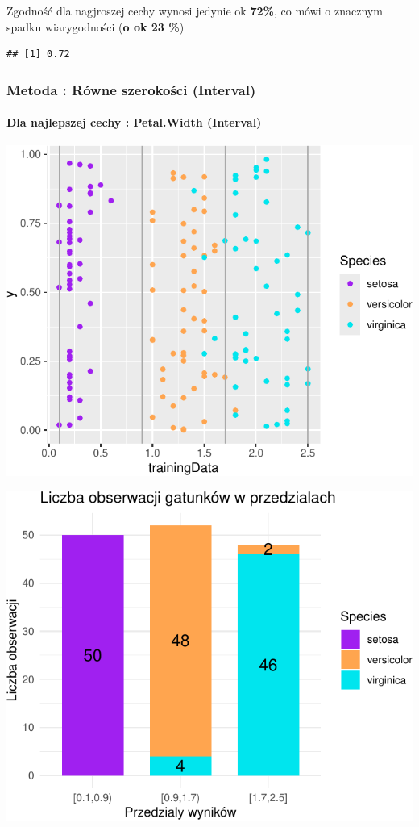 \documentclass[
  12pt,
]{article}
\begin{document}
Zgodność dla nagjroszej cechy wynosi jedynie ok \textbf{72\%}, co mówi o
znacznym spadku wiarygodności (\textbf{o ok 23 \%})

\begin{verbatim}
## [1] 0.72
\end{verbatim}

\subsubsection{Metoda : Równe szerokości
(Interval)}\label{metoda-ruxf3wne-szerokoux15bci-interval}

\paragraph{Dla najlepszej cechy : Petal.Width
(Interval)}\label{dla-najlepszej-cechy-petal.width-interval}

\begin{center}\includegraphics{Sprawozdanie2_files/figure-latex/width_najl-1} \end{center}

\begin{center}\includegraphics{Sprawozdanie2_files/figure-latex/tabela_kondygnacji_2_najl-1} \end{center}
\end{document}
